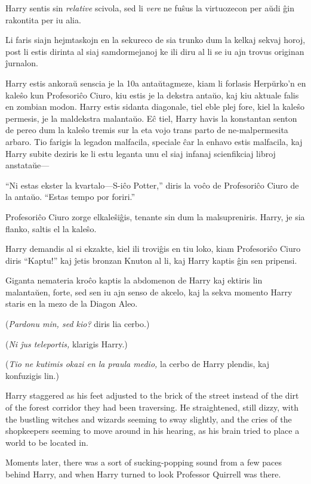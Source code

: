 Harry sentis sin \emph{relative} scivola, sed li \emph{vere} ne fuŝus
la virtuozecon per aŭdi ĝin rakontita per iu alia.

Li faris siajn hejmtaskojn en la sekureco de sia trunko dum la kelkaj
sekvaj horoj, post li estis dirinta al siaj samdormejanoj ke ili diru
al li se iu ajn trovus originan ĵurnalon.

Harry estis ankoraŭ senscia je la 10a antaŭtagmeze, kiam li forlasis
Herpŭrko'n en kaleŝo kun Profesoriĉo Ciuro, kiu estis je la dekstra
antaŭo, kaj kiu aktuale falis en zombian modon. Harry estis sidanta
diagonale, tiel eble plej fore, kiel la kaleŝo permesis, je la
maldekstra malantaŭo. Eĉ tiel, Harry havis la konstantan senton de
pereo dum la kaleŝo tremis sur la eta vojo trans parto de
ne-malpermesita arbaro. Tio farigis la legadon malfacila, speciale ĉar
la enhavo estis malfacila, kaj Harry subite deziris ke li estu leganta
unu el siaj infanaj scienfikciaj libroj anstataŭe—

``Ni estas ekster la kvartalo—S-iĉo Potter,'' diris la voĉo de
Profesoriĉo Ciuro de la antaŭo. ``Estas tempo por foriri.''

Profesoriĉo Ciuro zorge elkaleŝiĝis, tenante sin dum la malsupreniris. Harry, je sia flanko, saltis el la kaleŝo.

Harry demandis al si ekzakte, kiel ili troviĝis en tiu loko, kiam
Profesoriĉo Ciuro diris ``Kaptu!'' kaj ĵetis bronzan Knuton al li, kaj
Harry kaptis ĝin sen pripensi.

Giganta nemateria kroĉo kaptis la abdomenon de Harry kaj ektiris lin
malantaŭen, forte, sed sen iu ajn senso de akcelo, kaj la sekva
momento Harry staris en la mezo de la Diagon Aleo.

(\emph{Pardonu min, sed kio?} diris lia cerbo.)

(\emph{Ni ĵus teleportis,} klarigis Harry.)

(\emph{Tio ne kutimis okazi en la praula medio,} la cerbo de Harry plendis, kaj konfuzigis lin.)

Harry staggered as his feet adjusted to the brick of the street instead of the dirt of the forest corridor they had been traversing. He straightened, still dizzy, with the bustling witches and wizards seeming to sway slightly, and the cries of the shopkeepers seeming to move around in his hearing, as his brain tried to place a world to be located in.

Moments later, there was a sort of sucking-popping sound from a few paces behind Harry, and when Harry turned to look Professor Quirrell was there.

